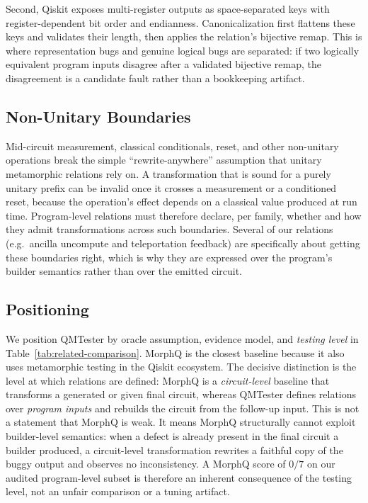 Second, Qiskit exposes multi-register outputs as space-separated keys with register-dependent bit order and endianness. Canonicalization first flattens these keys and validates their length, then applies the relation's bijective remap. This is where representation bugs and genuine logical bugs are separated: if two logically equivalent program inputs disagree after a validated bijective remap, the disagreement is a candidate fault rather than a bookkeeping artifact.

\subsection{Non-Unitary Boundaries}
\label{sec:nonunitary}

Mid-circuit measurement, classical conditionals, reset, and other non-unitary operations break the simple ``rewrite-anywhere'' assumption that unitary metamorphic relations rely on. A transformation that is sound for a purely unitary prefix can be invalid once it crosses a measurement or a conditioned reset, because the operation's effect depends on a classical value produced at run time. Program-level relations must therefore declare, per family, whether and how they admit transformations across such boundaries. Several of our relations (e.g.\ ancilla uncompute and teleportation feedback) are specifically about getting these boundaries right, which is why they are expressed over the program's builder semantics rather than over the emitted circuit.

\subsection{Positioning}

We position QMTester by oracle assumption, evidence model, and \emph{testing level} in Table~\ref{tab:related-comparison}. MorphQ is the closest baseline because it also uses metamorphic testing in the Qiskit ecosystem. The decisive distinction is the level at which relations are defined: MorphQ is a \emph{circuit-level} baseline that transforms a generated or given final circuit, whereas QMTester defines relations over \emph{program inputs} and rebuilds the circuit from the follow-up input. This is not a statement that MorphQ is weak. It means MorphQ structurally cannot exploit builder-level semantics: when a defect is already present in the final circuit a builder produced, a circuit-level transformation rewrites a faithful copy of the buggy output and observes no inconsistency. A MorphQ score of $0/7$ on our audited program-level subset is therefore an inherent consequence of the testing level, not an unfair comparison or a tuning artifact.

